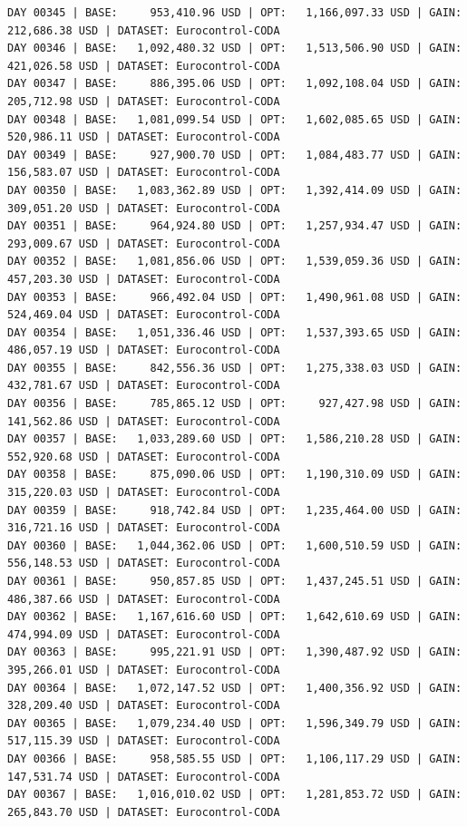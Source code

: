 \documentclass[11pt,a4paper]{article}
\begin{document}
\begin{verbatim}
DAY 00345 | BASE:     953,410.96 USD | OPT:   1,166,097.33 USD | GAIN: 212,686.38 USD | DATASET: Eurocontrol-CODA
DAY 00346 | BASE:   1,092,480.32 USD | OPT:   1,513,506.90 USD | GAIN: 421,026.58 USD | DATASET: Eurocontrol-CODA
DAY 00347 | BASE:     886,395.06 USD | OPT:   1,092,108.04 USD | GAIN: 205,712.98 USD | DATASET: Eurocontrol-CODA
DAY 00348 | BASE:   1,081,099.54 USD | OPT:   1,602,085.65 USD | GAIN: 520,986.11 USD | DATASET: Eurocontrol-CODA
DAY 00349 | BASE:     927,900.70 USD | OPT:   1,084,483.77 USD | GAIN: 156,583.07 USD | DATASET: Eurocontrol-CODA
DAY 00350 | BASE:   1,083,362.89 USD | OPT:   1,392,414.09 USD | GAIN: 309,051.20 USD | DATASET: Eurocontrol-CODA
DAY 00351 | BASE:     964,924.80 USD | OPT:   1,257,934.47 USD | GAIN: 293,009.67 USD | DATASET: Eurocontrol-CODA
DAY 00352 | BASE:   1,081,856.06 USD | OPT:   1,539,059.36 USD | GAIN: 457,203.30 USD | DATASET: Eurocontrol-CODA
DAY 00353 | BASE:     966,492.04 USD | OPT:   1,490,961.08 USD | GAIN: 524,469.04 USD | DATASET: Eurocontrol-CODA
DAY 00354 | BASE:   1,051,336.46 USD | OPT:   1,537,393.65 USD | GAIN: 486,057.19 USD | DATASET: Eurocontrol-CODA
DAY 00355 | BASE:     842,556.36 USD | OPT:   1,275,338.03 USD | GAIN: 432,781.67 USD | DATASET: Eurocontrol-CODA
DAY 00356 | BASE:     785,865.12 USD | OPT:     927,427.98 USD | GAIN: 141,562.86 USD | DATASET: Eurocontrol-CODA
DAY 00357 | BASE:   1,033,289.60 USD | OPT:   1,586,210.28 USD | GAIN: 552,920.68 USD | DATASET: Eurocontrol-CODA
DAY 00358 | BASE:     875,090.06 USD | OPT:   1,190,310.09 USD | GAIN: 315,220.03 USD | DATASET: Eurocontrol-CODA
DAY 00359 | BASE:     918,742.84 USD | OPT:   1,235,464.00 USD | GAIN: 316,721.16 USD | DATASET: Eurocontrol-CODA
DAY 00360 | BASE:   1,044,362.06 USD | OPT:   1,600,510.59 USD | GAIN: 556,148.53 USD | DATASET: Eurocontrol-CODA
DAY 00361 | BASE:     950,857.85 USD | OPT:   1,437,245.51 USD | GAIN: 486,387.66 USD | DATASET: Eurocontrol-CODA
DAY 00362 | BASE:   1,167,616.60 USD | OPT:   1,642,610.69 USD | GAIN: 474,994.09 USD | DATASET: Eurocontrol-CODA
DAY 00363 | BASE:     995,221.91 USD | OPT:   1,390,487.92 USD | GAIN: 395,266.01 USD | DATASET: Eurocontrol-CODA
DAY 00364 | BASE:   1,072,147.52 USD | OPT:   1,400,356.92 USD | GAIN: 328,209.40 USD | DATASET: Eurocontrol-CODA
DAY 00365 | BASE:   1,079,234.40 USD | OPT:   1,596,349.79 USD | GAIN: 517,115.39 USD | DATASET: Eurocontrol-CODA
DAY 00366 | BASE:     958,585.55 USD | OPT:   1,106,117.29 USD | GAIN: 147,531.74 USD | DATASET: Eurocontrol-CODA
DAY 00367 | BASE:   1,016,010.02 USD | OPT:   1,281,853.72 USD | GAIN: 265,843.70 USD | DATASET: Eurocontrol-CODA

\end{verbatim}
\end{document}
